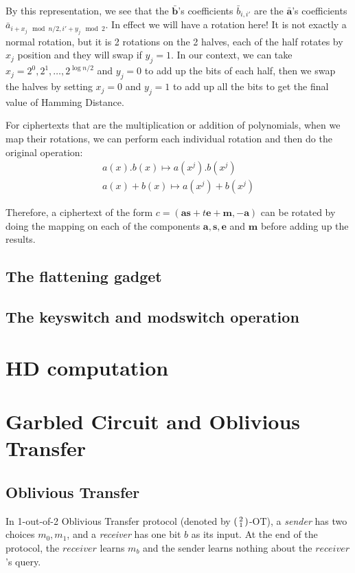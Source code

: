 \begin{description}
  By this representation, we see that the \(\mathbf{\bar{b}}\)'s coefficients
  \(\bar{b}_{i,i'}\) are the \(\mathbf{\bar{a}}\)'s coefficients
  \(\bar{a}_{i+x_{j} \mod n/2, i' + y_{j} \mod 2}\). In effect we will have a
  rotation here! It is not exactly a normal rotation, but it is 2 rotations on
  the 2 halves, each of the half rotates by \(x_{j}\) position and they will
  swap if \(y_{j} = 1\). In our context, we can take
  \(x_{j} = 2^{0}, 2^{1}, \dots, 2^{\log n/2}\) and \(y_{j} = 0\) to add up the
  bits of each half, then we swap the halves by setting \(x_{j} = 0\) and
  \(y_{j} = 1\) to add up all the bits to get the final value of Hamming
  Distance.
  
  For ciphertexts that are the multiplication or addition of polynomials, when
  we map their rotations, we can perform each individual rotation and then do
  the original operation:
\begin{align*}
  a(x).b(x) \mapsto a(x^{j}).b(x^{j})\\
  a(x) + b(x) \mapsto a(x^{j}) + b(x^{j})
\end{align*}

Therefore, a ciphertext of the form
\(c = (\mathbf{as} + t \mathbf{e} + \mathbf{m}, -\mathbf{a})\) can be rotated by
doing the mapping on each of the components \(\mathbf{a},\mathbf{s},\mathbf{e}\)
and \(\mathbf{m}\) before adding up the results.
\end{description}

\subsection{The flattening gadget}
\label{sec:6flattening}

\subsection{The keyswitch and modswitch operation}
\label{sec:6keyswitch}

\section{HD computation}
\label{sec:6hdcomp}

\section{Garbled Circuit and Oblivious Transfer}
\label{sec:6garbled}

\subsection{Oblivious Transfer}
In 1-out-of-2 Oblivious Transfer protocol (denoted by
\(\begin{psmallmatrix} 2 \\ 1 \end{psmallmatrix} \)-OT), a \textit{sender} has
two choices \(m_{0}, m_{1}\), and a \textit{receiver} has one bit \(b\) as its
input. At the end of the protocol, the \(receiver\) learns \(m_{b}\) and the
sender learns nothing about the \(receiver\)'s query.

